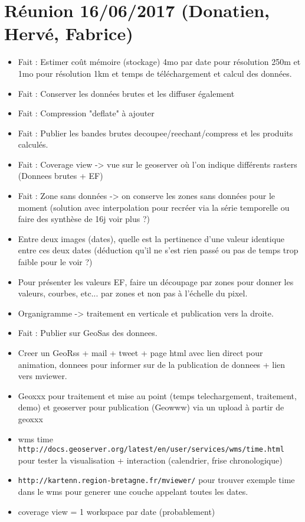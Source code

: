 \documentclass[10pt,a4paper]{article}
\begin{document}
\section{Réunion 16/06/2017 (Donatien, Hervé, Fabrice)}
\begin{itemize}
\item Fait : Estimer coût mémoire (stockage) 4mo par date pour résolution 250m et 1mo pour résolution 1km et temps de téléchargement et calcul des données.
\item Fait : Conserver les données brutes et les diffuser également
\item Fait : Compression "deflate" à ajouter
\item Fait : Publier les bandes brutes decoupee/reechant/compress et les produits calculés.
\item Fait : Coverage view -> vue sur le geoserver où l'on indique différents rasters (Donnees brutes + EF)
\item Fait : Zone sans données -> on conserve les zones sans données pour le moment (solution avec interpolation pour recréer via la série temporelle ou faire des synthèse de 16j voir plus ?)
\item Entre deux images (dates), quelle est la pertinence d'une valeur identique entre ces deux dates (déduction qu'il ne s'est rien passé ou pas de temps trop faible pour le voir ?)
\item Pour présenter les valeurs EF, faire un découpage par zones pour donner les valeurs, courbes, etc... par zones et non pas à l'échelle du pixel.
\item Organigramme -> traitement en verticale et publication vers la droite.
\item Fait : Publier sur GeoSas des donnees.
\item Creer un GeoRss + mail + tweet + page html avec lien direct pour animation, donnees pour informer sur de la publication de donnees + lien vers mviewer.
\item Geoxxx pour traitement et mise au point (temps telechargement, traitement, demo) et geoserver pour publication (Geowww) via un upload à partir de geoxxx
\item wms time \verb!http://docs.geoserver.org/latest/en/user/services/wms/time.html! pour tester la visualisation + interaction (calendrier, frise chronologique)
\item \verb!http://kartenn.region-bretagne.fr/mviewer/! pour trouver exemple time dans le wms pour generer une couche appelant toutes les dates.
\item coverage view = 1 workspace par date (probablement)

\end{itemize}
\end{document}
